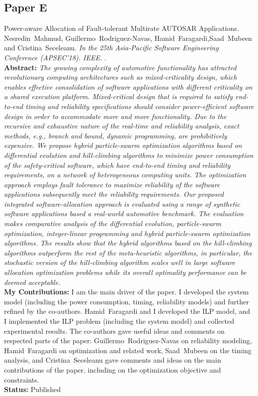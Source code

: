 \subsection*{Paper E}
Power-aware Allocation of Fault-tolerant Multirate AUTOSAR Applications. 
Nesredin~Mahmud, Guillermo~Rodriguez-Navas, Hamid~Faragardi,Saad~Mubeen and Cristina~Seceleanu. \textit{In the 25th Asia-Pacific Software Engineering Conference (APSEC'18). IEEE.} \label{lbl_resa}. \label{lbl_softwareallocation_ilp}
\\[6pt]%
\textbf{Abstract:} \textit{The growing complexity of automotive functionality has attracted revolutionary computing architectures such as mixed-criticality design, which enables effective consolidation of software applications with different criticality on a shared execution platform. Mixed-critical design that is required to satisfy end-to-end timing and reliability specifications should consider power-efficient software design in order to accommodate more and more functionality. Due to the recursive and exhaustive nature of the real-time and reliability analysis, exact methods, e.g., branch and bound, dynamic programming, are prohibitively expensive. We propose hybrid particle-swarm optimization algorithms based on differential evolution and hill-climbing algorithms to minimize power consumption of the safety-critical software, which have end-to-end timing and reliability requirements, on a network of heterogeneous computing units. The optimization approach employs fault tolerance to maximize reliability of the software applications subsequently meet the reliability requirements. Our proposed integrated software-allocation approach is evaluated using a range of synthetic software applications based a real-world automotive benchmark. The evaluation makes comparative analysis of the differential evolution, particle-swarm optimization, integer-linear programming and hybrid particle-swarm optimization algorithms. The results show that the hybrid algorithms based on the hill-climbing algorithms outperform the rest of the meta-heuristic algorithms, in particular, the stochastic version of the hill-climbing algorithm scales well in large software allocation optimization problems while its overall optimality performance can be deemed acceptable.
}\\[6pt]%
\textbf{My Contributions: } I am the main driver of the paper. I developed the system model (including the power consumption, timing, reliability models) and further refined by the co-authors. Hamid~Faragardi and I developed the ILP model, and I implemented the ILP problem (including the system model) and collected experimental results. The co-authors gave useful ideas and comments on respected parts of the paper: Guillermo~Rodriguez-Navas on reliability modeling, Hamid~Faragardi on optimization and related work, Saad~Mubeen on the timing analysis, and Cristina~Seceleanu gave comments and ideas on the main contributions of the paper, including on the optimization objective and constraints.\\%
\textbf{Status:} Published


